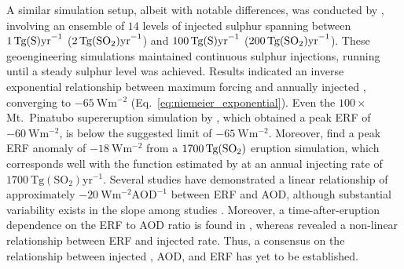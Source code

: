 \documentclass[draft]{agujournal2019}
\begin{document}
  A similar simulation setup, albeit with notable differences, was conducted by
  , involving an ensemble of \(14\) levels of injected sulphur
  spanning between \(\SI{1}{\tera\gram(\ce{S})\mathrm{yr}^{-1}}\)
  (\(\SI{2}{\tera\gram(\ce{SO2})\mathrm{yr}^{-1}}\)) and
  \(\SI{100}{\tera\gram(\ce{S})\mathrm{yr}^{-1}}\)
  (\(\SI{200}{\tera\gram(\ce{SO2})\mathrm{yr}^{-1}}\)). These geoengineering simulations
  maintained continuous sulphur injections, running until a steady sulphur level was
  achieved. Results indicated an inverse exponential relationship between maximum
  forcing and  annually injected , converging to
  \(\SI{-65}{\watt\metre^{-2}}\) (Eq.~\ref{eq:niemeier_exponential}). Even the
  \(100\times\) Mt.\ Pinatubo supereruption simulation by , which
  obtained a peak ERF of \(\SI{-60}{\watt\metre^{-2}}\), is below the suggested limit of
  \(\SI{-65}{\watt\metre^{-2}}\).  Moreover, 
  find a peak ERF anomaly of \(\SI{-18}{\watt\metre^{-2}}\) from a
  \(\SI{1700}{\tera\gram(\ce{SO2})}\) eruption simulation, which corresponds well with
  the function estimated by  at an annual injecting rate of
  \(\SI{1700}{\tera\gram(\mathrm{SO_2})\mathrm{yr}^{-1}}\). Several studies have
  demonstrated a linear relationship of approximately
  \(-\SI{20}{\watt\metre^{-2}\mathrm{AOD}^{-1}}\) between ERF and AOD, although
  substantial variability exists in the slope among studies
  \cite{mills2017,hansen2005,gregory2016,marshall2020,pitari2016b}. Moreover, a
  time-after-eruption dependence on the ERF to AOD ratio is found in
  , whereas  revealed a non-linear relationship
  between ERF and injected  rate. Thus, a consensus on the relationship between
  injected , AOD, and ERF has yet to be established.
\end{document}
